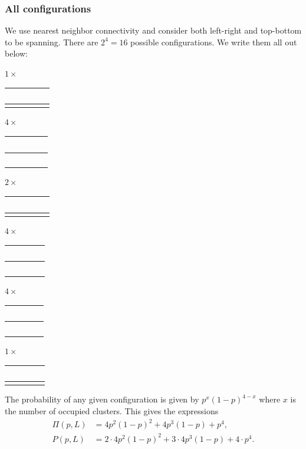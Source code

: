 \documentclass[a4paper, 11pt, notitlepage, english]{article}
\begin{document}
\subsubsection*{All configurations}
We use nearest neighbor connectivity and consider both left-right and top-bottom to be spanning. There are $2^4 = 16$ possible configurations. We write them all out below:

\begin{center}
$1\times$
\begin{tabular}{|c|c|}
  \hline
  \ \ \ &  \ \ \  \\ \hline
  \qquad & \qquad \\
  \hline
\end{tabular} \qquad
\qquad $4\times$
\begin{tabular}{|c|c|}
  \hline
  \ \ \cellcolor{black} &  \ \ \  \\ \hline
  \ \ \ & \qquad \\
  \hline
\end{tabular} \qquad 
\qquad $2\times$
\begin{tabular}{|c|c|}
  \hline
  \ \ \ & \cellcolor{black} \ \ \  \\ \hline
  \cellcolor{black} & \qquad \\
  \hline
\end{tabular}	

$4\times$
\begin{tabular}{|c|c|}
  \hline
  \ \ \cellcolor{black}&  \ \ \  \\ \hline
  \ \ \cellcolor{black} & \qquad \\
  \hline
\end{tabular} \qquad
\qquad $4\times$
\begin{tabular}{|c|c|}
  \hline
  \  \cellcolor{black} & \cellcolor{black} \ \ \  \\ \hline
  \ \  \cellcolor{black} & \qquad \\
  \hline
\end{tabular} \qquad 
\qquad $1\times$
\begin{tabular}{|c|c|}
  \hline
  \ \ \cellcolor{black} & \cellcolor{black} \ \ \  \\ \hline
  \cellcolor{black} & \cellcolor{black} \qquad \\
  \hline
\end{tabular}	
\end{center}
The probability of any given configuration is given by $p^x(1-p)^{4-x}$ where $x$ is the number of occupied clusters. This gives the expressions
\begin{align*}
\Pi(p, L) &= 4p^2(1-p)^2 + 4p^3(1-p) + p^4, \\
P(p, L) &= 2\cdot 4p^2(1-p)^2 + 3\cdot 4p^3(1-p) + 4\cdot p^4. \\
\end{align*}
\end{document}
